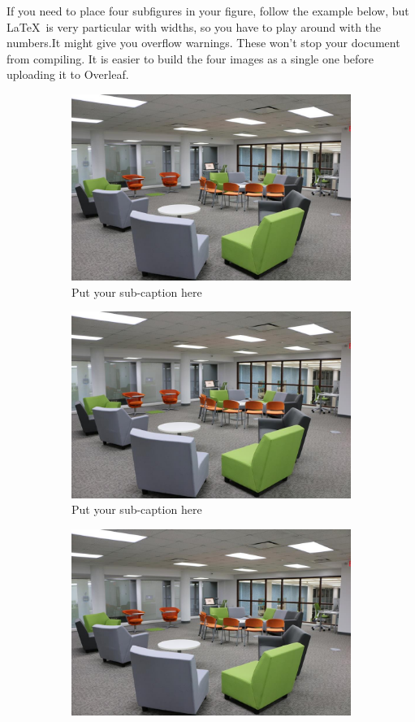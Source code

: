 \noindent If you need to place four subfigures in your figure, follow the example below, but \LaTeX\ is very particular with widths, so you have to play around with the numbers.It might give you overflow warnings. These won't stop your document from compiling.  It is easier to build the four images as a single one before uploading it to Overleaf.

\begin{figure}[ht]
\begin{subfigure}{.5\textwidth}
  \centering
  \includegraphics[width=.8\linewidth]{images/2}  
  \caption{Put your sub-caption here}
  \label{fig:sub-firstfirst}
\end{subfigure}
\begin{subfigure}{.5\textwidth}
  \centering
  \includegraphics[width=.8\linewidth]{images/2}  
  \caption{Put your sub-caption here}
  \label{fig:sub-secondsecond}
\end{subfigure}
\begin{subfigure}{.5\textwidth}
  \centering
  \includegraphics[width=.8\linewidth]{images/2}  

\end{subfigure}
\end{figure}
